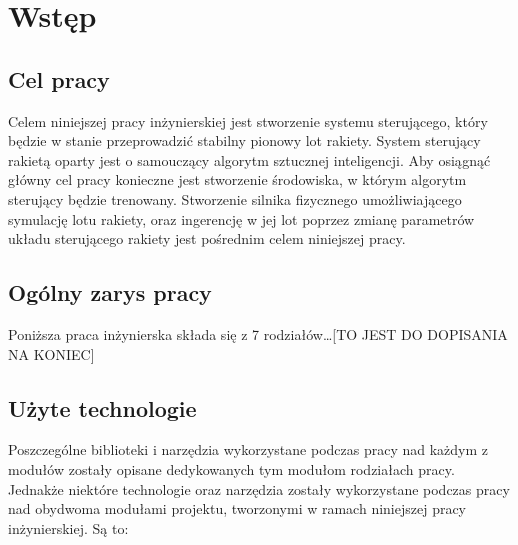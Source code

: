 \chapter{Wstęp}

\section{Cel pracy}
Celem niniejszej pracy inżynierskiej jest stworzenie systemu sterującego,
który będzie w stanie przeprowadzić stabilny pionowy lot rakiety. System sterujący rakietą oparty jest o samouczący algorytm sztucznej inteligencji. Aby osiągnąć główny cel pracy konieczne jest stworzenie środowiska, w którym algorytm sterujący będzie trenowany. Stworzenie silnika fizycznego umożliwiającego symulację lotu rakiety, oraz ingerencję w jej lot poprzez zmianę parametrów układu sterującego rakiety jest pośrednim celem niniejszej pracy.

\section{Ogólny zarys pracy}

Poniższa praca inżynierska składa się z 7 rodziałów\ldots [TO JEST DO DOPISANIA NA KONIEC]

\section{Użyte technologie}
Poszczególne biblioteki i narzędzia wykorzystane podczas pracy nad każdym z
modułów zostały opisane dedykowanych tym modułom rodziałach pracy.
Jednakże niektóre technologie oraz narzędzia zostały wykorzystane podczas
pracy nad
obydwoma modułami projektu, tworzonymi w ramach niniejszej pracy inżynierskiej.
Są to:

